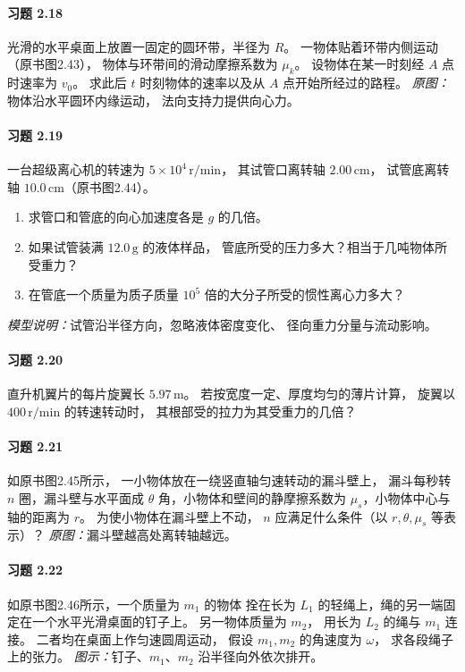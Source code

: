 \paragraph{习题 2.18}
光滑的水平桌面上放置一固定的圆环带，半径为 \(R\)。
一物体贴着环带内侧运动（原书图2.43），
物体与环带间的滑动摩擦系数为 \(\mu_k\)。
设物体在某一时刻经 \(A\) 点时速率为 \(v_0\)。
求此后 \(t\) 时刻物体的速率以及从 \(A\) 点开始所经过的路程。
\textit{原图：}物体沿水平圆环内缘运动，
法向支持力提供向心力。

\paragraph{习题 2.19}
一台超级离心机的转速为
\(5\times10^4\,\mathrm{r/min}\)，
其试管口离转轴 \(2.00\,\mathrm{cm}\)，
试管底离转轴 \(10.0\,\mathrm{cm}\)（原书图2.44）。
\begin{enumerate}
\item 求管口和管底的向心加速度各是 \(g\) 的几倍。
\item 如果试管装满 \(12.0\,\mathrm g\) 的液体样品，
管底所受的压力多大？相当于几吨物体所受重力？
\item 在管底一个质量为质子质量
\(10^5\) 倍的大分子所受的惯性离心力多大？
\end{enumerate}
\textit{模型说明：}试管沿半径方向，忽略液体密度变化、
径向重力分量与流动影响。

\paragraph{习题 2.20}
直升机翼片的每片旋翼长 \(5.97\,\mathrm m\)。
若按宽度一定、厚度均匀的薄片计算，
旋翼以 \(400\,\mathrm{r/min}\) 的转速转动时，
其根部受的拉力为其受重力的几倍？

\paragraph{习题 2.21}
如原书图2.45所示，
一小物体放在一绕竖直轴匀速转动的漏斗壁上，
漏斗每秒转 \(n\) 圈，漏斗壁与水平面成
\(\theta\) 角，小物体和壁间的静摩擦系数为
\(\mu_s\)，小物体中心与轴的距离为 \(r\)。
为使小物体在漏斗壁上不动，
\(n\) 应满足什么条件（以 \(r,\theta,\mu_s\) 等表示）？
\textit{原图：}漏斗壁越高处离转轴越远。

\paragraph{习题 2.22}
如原书图2.46所示，一个质量为 \(m_1\) 的物体
拴在长为 \(L_1\) 的轻绳上，绳的另一端固定在一个水平光滑桌面的钉子上。
另一物体质量为 \(m_2\)，
用长为 \(L_2\) 的绳与 \(m_1\) 连接。
二者均在桌面上作匀速圆周运动，
假设 \(m_1,m_2\) 的角速度为 \(\omega\)，
求各段绳子上的张力。
\textit{图示：}钉子、\(m_1\)、\(m_2\) 沿半径向外依次排开。

